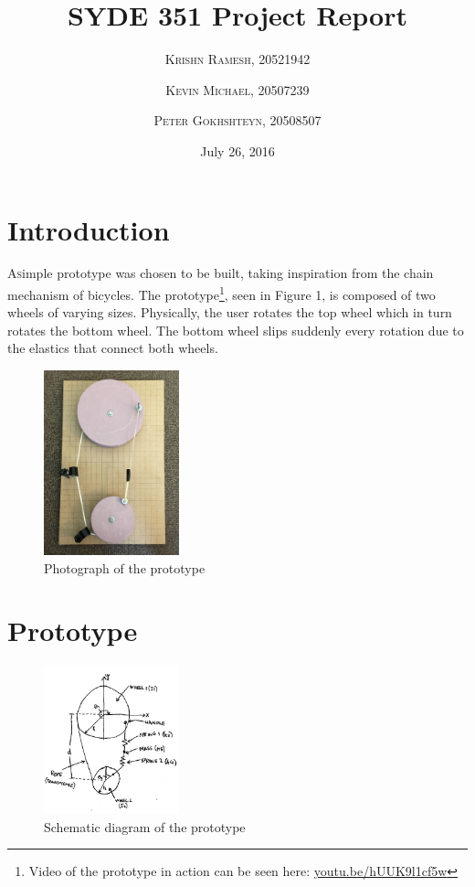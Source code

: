 \documentclass[twoside,twocolumn]{article}
\title{SYDE 351 Project Report} %
\author{%
\textsc{Krishn Ramesh, 20521942} \\[1ex]
\and
\textsc{Kevin Michael, 20507239} \\[1ex]
\and
\textsc{Peter Gokhshteyn, 20508507} \\[1ex]
}
\date{July 26, 2016} %
\begin{document}
\maketitle


\section{Introduction}

\lettrine[nindent=0em,lines=3]{A} simple prototype was chosen to be built, taking inspiration from the chain mechanism of bicycles. The prototype\footnote{Video of the prototype in action can be seen here: \href{url}{youtu.be/hUUK9l1cf5w}}, seen in Figure 1, is composed of two wheels of varying sizes. Physically, the user rotates the top wheel which in turn rotates the bottom wheel. The bottom wheel slips suddenly every rotation due to the elastics that connect both wheels.

\begin{figure}[!t]
    \caption{Photograph of the prototype}
    \centering
        \includegraphics[width=0.35\textwidth]{prototype.jpg}
\end{figure}


\section{Prototype}

\begin{figure}[!t]
    \caption{Schematic diagram of the prototype}
    \centering
        \includegraphics[width=0.35\textwidth]{schematic.png}
\end{figure}
\end{document}
